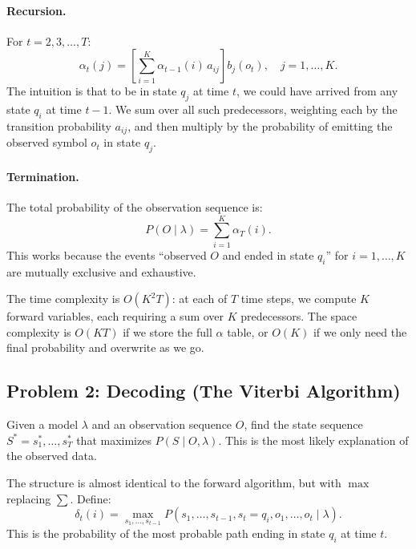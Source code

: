 \paragraph{Recursion.}
For $t = 2, 3, \ldots, T$:
\begin{equation}
\label{eq:forward-recursion}
  \alpha_t(j) = \left[ \sum_{i=1}^{K} \alpha_{t-1}(i) \, a_{ij} \right] b_j(o_t), \quad j = 1, \ldots, K.
\end{equation}
The intuition is that to be in state $q_j$ at time $t$, we could have arrived from any state $q_i$ at time $t-1$.
We sum over all such predecessors, weighting each by the transition probability $a_{ij}$, and then multiply by the probability of emitting the observed symbol $o_t$ in state $q_j$.

\paragraph{Termination.}
The total probability of the observation sequence is:
\begin{equation}
\label{eq:forward-termination}
  P(O \mid \lambda) = \sum_{i=1}^{K} \alpha_T(i).
\end{equation}
This works because the events ``observed $O$ and ended in state $q_i$'' for $i = 1, \ldots, K$ are mutually exclusive and exhaustive.

The time complexity is $O(K^2 T)$: at each of $T$ time steps, we compute $K$ forward variables, each requiring a sum over $K$ predecessors.
The space complexity is $O(KT)$ if we store the full $\alpha$ table, or $O(K)$ if we only need the final probability and overwrite as we go.


\subsection{Problem 2: Decoding (The Viterbi Algorithm)}
\label{sec:viterbi}

Given a model $\lambda$ and an observation sequence $O$, find the state sequence $S^* = s_1^*, \ldots, s_T^*$ that maximizes $P(S \mid O, \lambda)$.
This is the most likely explanation of the observed data.

The structure is almost identical to the forward algorithm, but with $\max$ replacing $\sum$.
Define:
\begin{equation}
\label{eq:viterbi-def}
  \delta_t(i) = \max_{s_1, \ldots, s_{t-1}} P(s_1, \ldots, s_{t-1}, s_t = q_i, o_1, \ldots, o_t \mid \lambda).
\end{equation}
This is the probability of the most probable path ending in state $q_i$ at time $t$.

